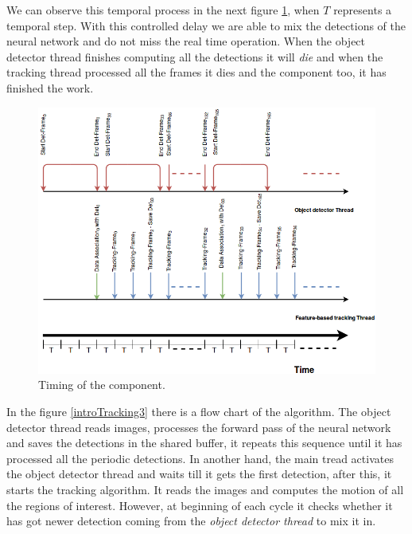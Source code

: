 We can observe this temporal process in the next figure \ref{software2timin}, when $T$ represents a temporal step. With this controlled delay we are able to mix the detections of the neural network and do not miss the real time operation. When the object detector thread finishes computing all the detections it will \textit{die} and when the tracking thread processed all the frames it dies and the component too, it has finished the work. 


\begin{figure}[H]
\centering         
\includegraphics[width=\textwidth]{timesDiagram/timingVersion(1).png}
\caption{Timing of the component.} \label{software2timin}
\end{figure}


In the figure \ref{introTracking3} there is a flow chart of the algorithm. The object detector thread reads images, processes the forward pass of the neural network and saves the detections in the shared buffer, it repeats this sequence until it has processed all the periodic detections. In another hand, the main tread activates the object detector thread and waits till it gets the first detection, after this, it starts the tracking algorithm. It reads the images and computes the motion of all the regions of interest. However, at beginning of each cycle it checks whether it has got newer detection coming from the \textit{object detector thread} to mix it in.

